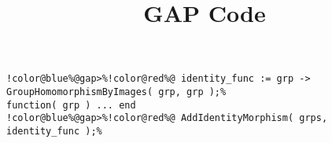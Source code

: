 \documentclass[12pt]{amsart}
\title{GAP Code}
\author{}
\begin{document}
\maketitle

\begin{Verbatim}[commandchars=!@\%,frame=single]
!color@blue%@gap>%!color@red%@ identity_func := grp -> GroupHomomorphismByImages( grp, grp );%
function( grp ) ... end
!color@blue%@gap>%!color@red%@ AddIdentityMorphism( grps, identity_func );%
\end{Verbatim}
\end{document}
